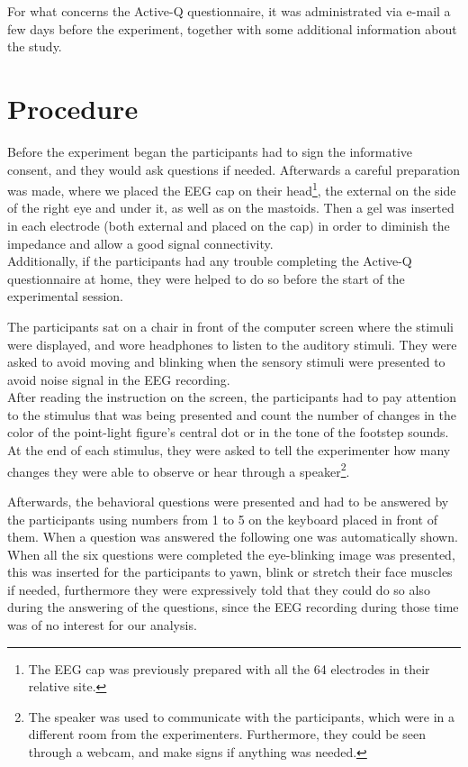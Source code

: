 For what concerns the Active-Q questionnaire, it was administrated via e-mail a few days before the experiment, together with some additional information about the study.

\section{Procedure}
Before the experiment began the participants had to sign the informative consent, and they would ask questions if needed. Afterwards a careful preparation was made, where we placed the EEG cap on their head\footnote{The EEG cap was previously prepared with all the 64 electrodes in their relative site.}, the external on the side of the right eye and under it, as well as on the mastoids. Then a gel was inserted in each electrode (both external and placed on the cap) in order to diminish the impedance and allow a good signal connectivity. \\
Additionally, if the participants had any trouble completing the Active-Q questionnaire at home, they were helped to do so before the start of the experimental session. 

The participants sat on a chair in front of the computer screen where the stimuli were displayed, and wore headphones to listen to the auditory stimuli. They were asked to avoid moving and blinking when the sensory stimuli were presented to avoid noise signal in the EEG recording. \\
After reading the instruction on the screen, the participants had to pay attention to the stimulus that was being presented and count the number of changes in the color of the point-light figure's central dot or in the tone of the footstep sounds. At the end of each stimulus, they were asked to tell the experimenter how many changes they were able to observe or hear through a speaker\footnote{The speaker was used to communicate with the participants, which were in a different room from the experimenters. Furthermore, they could be seen through a webcam, and make signs if anything was needed.}. 

Afterwards, the behavioral questions were presented and had to be answered by the participants using numbers from 1 to 5 on the keyboard placed in front of them. When a question was answered the following one was automatically shown. When all the six questions were completed the eye-blinking image was presented, this was inserted for the participants to yawn, blink or stretch their face muscles if needed, furthermore they were expressively told that they could do so also during the answering of the questions, since the EEG recording during those time was of no interest for our analysis.  

